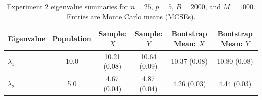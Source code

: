 \begin{table}[htbp]
\centering
\small
\caption{Experiment 2 eigenvalue summaries for $n=25$, $p=5$, $B=2000$, and $M=1000$. Entries are Monte Carlo means (MCSEs).}
\label{tab:exp2_eigenvalues}
\begin{tabular}{lccccc}
\hline\hline
\textbf{Eigenvalue} & \textbf{Population} & \textbf{Sample: $X$} & \textbf{Sample: $Y$} & \textbf{Bootstrap Mean: $X$} & \textbf{Bootstrap Mean: $Y$} \\
\hline
$\lambda_1$ & 10.0 & 10.21 (0.08) & 10.64 (0.09) & 10.37 (0.08) & 10.80 (0.08) \\
$\lambda_2$ & 5.0 & 4.67 (0.04) & 4.87 (0.04) & 4.26 (0.03) & 4.44 (0.03) \\
\hline\hline
\end{tabular}
\end{table}

